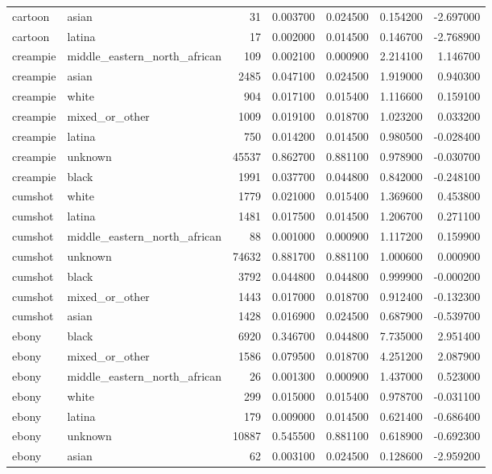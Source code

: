 \begin{tabular}{llrrrrr}
cartoon & asian & 31 & 0.003700 & 0.024500 & 0.154200 & -2.697000 \\
cartoon & latina & 17 & 0.002000 & 0.014500 & 0.146700 & -2.768900 \\
creampie & middle_eastern_north_african & 109 & 0.002100 & 0.000900 & 2.214100 & 1.146700 \\
creampie & asian & 2485 & 0.047100 & 0.024500 & 1.919000 & 0.940300 \\
creampie & white & 904 & 0.017100 & 0.015400 & 1.116600 & 0.159100 \\
creampie & mixed_or_other & 1009 & 0.019100 & 0.018700 & 1.023200 & 0.033200 \\
creampie & latina & 750 & 0.014200 & 0.014500 & 0.980500 & -0.028400 \\
creampie & unknown & 45537 & 0.862700 & 0.881100 & 0.978900 & -0.030700 \\
creampie & black & 1991 & 0.037700 & 0.044800 & 0.842000 & -0.248100 \\
cumshot & white & 1779 & 0.021000 & 0.015400 & 1.369600 & 0.453800 \\
cumshot & latina & 1481 & 0.017500 & 0.014500 & 1.206700 & 0.271100 \\
cumshot & middle_eastern_north_african & 88 & 0.001000 & 0.000900 & 1.117200 & 0.159900 \\
cumshot & unknown & 74632 & 0.881700 & 0.881100 & 1.000600 & 0.000900 \\
cumshot & black & 3792 & 0.044800 & 0.044800 & 0.999900 & -0.000200 \\
cumshot & mixed_or_other & 1443 & 0.017000 & 0.018700 & 0.912400 & -0.132300 \\
cumshot & asian & 1428 & 0.016900 & 0.024500 & 0.687900 & -0.539700 \\
ebony & black & 6920 & 0.346700 & 0.044800 & 7.735000 & 2.951400 \\
ebony & mixed_or_other & 1586 & 0.079500 & 0.018700 & 4.251200 & 2.087900 \\
ebony & middle_eastern_north_african & 26 & 0.001300 & 0.000900 & 1.437000 & 0.523000 \\
ebony & white & 299 & 0.015000 & 0.015400 & 0.978700 & -0.031100 \\
ebony & latina & 179 & 0.009000 & 0.014500 & 0.621400 & -0.686400 \\
ebony & unknown & 10887 & 0.545500 & 0.881100 & 0.618900 & -0.692300 \\
ebony & asian & 62 & 0.003100 & 0.024500 & 0.128600 & -2.959200 \\

\end{tabular}
